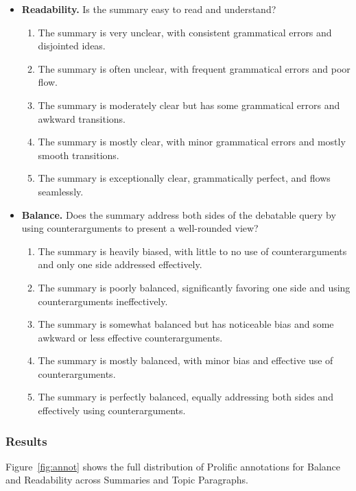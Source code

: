 \begin{itemize}
    \item \textbf{Readability.} Is the summary easy to read and understand?
    \begin{enumerate}
        \item The summary is very unclear, with consistent grammatical errors and disjointed ideas.
        \item The summary is often unclear, with frequent grammatical errors and poor flow.
        \item The summary is moderately clear but has some grammatical errors and awkward transitions.
        \item The summary is mostly clear, with minor grammatical errors and mostly smooth transitions.
        \item The summary is exceptionally clear, grammatically perfect, and flows seamlessly.
    \end{enumerate}

    \item \textbf{Balance.} Does the summary address both sides of the debatable query by using counterarguments to present a well-rounded view?
    \begin{enumerate}
        \item The summary is heavily biased, with little to no use of counterarguments and only one side addressed effectively.
        \item The summary is poorly balanced, significantly favoring one side and using counterarguments ineffectively.
        \item The summary is somewhat balanced but has noticeable bias and some awkward or less effective counterarguments.
        \item The summary is mostly balanced, with minor bias and effective use of counterarguments.
        \item The summary is perfectly balanced, equally addressing both sides and effectively using counterarguments.
    \end{enumerate}
\end{itemize}

\subsubsection{Results}

Figure~\ref{fig:annot} shows the full distribution of Prolific annotations for Balance and Readability across Summaries and Topic Paragraphs. 


